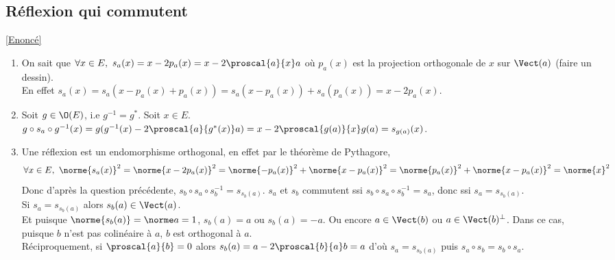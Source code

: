 \documentclass[8pt]{book}
\begin{document}
	\subsection{Réflexion qui commutent}
	\label{Réflexion qui commutent corrigé}
	\textcolor{blue}{\hyperref[Réflexion qui commutent]{[Enoncé]}}\\
	\begin{enumerate}[leftmargin=*]
		\item On sait que $\forall x\in E,\ s_a(x)=x-2p_a(x)=x-2\proscal{a}{x}a$ où $p_a(x)$ est la projection orthogonale de $x$ sur $\Vect(a)$ (faire un dessin).\\
		En effet $s_a(x)=s_a(x-p_a(x)+p_a(x))=s_a(x-p_a(x))+s_a(p_a(x))=x-2p_a(x)$.
		\item Soit $g\in \O(E)$, i.e $g^{-1}=g^*$. Soit $x\in E$.\\
		$g\circ s_a\circ g^{-1}(x)=g(g^{-1}(x)-2\proscal{a}{g^*(x)}a)=x-2\proscal{g(a)}{x}g(a)=s_{g(a)}(x)$.
		\item Une réflexion est un endomorphisme orthogonal, en effet par le théorème de Pythagore, $$\forall x\in E,\ \norme{s_a(x)}^2=\norme{x-2p_a(x)}^2=\norme{-p_a(x)}^2+\norme{x-p_a(x)}^2=\norme{p_a(x)}^2+\norme{x-p_a(x)}^2=\norme{x}^2$$
		Donc d'après la question précédente, $s_b\circ s_a\circ s_b^{-1}=s_{s_b(a)}$.
		$s_a$ et $s_b$ commutent ssi $s_b\circ s_a\circ s_b^{-1}=s_a$, donc ssi $s_a=s_{s_b(a)}$.\\
		Si $s_a=s_{s_b(a)}$ alors $s_b(a)\in\Vect(a)$.\\
		Et puisque $\norme{s_b(a)}=\norme a=1$, $s_b(a)=a$ ou $s_b(a)=-a$. Ou encore $a\in \Vect(b)$ ou $a\in \Vect(b)^\bot$. Dans ce cas, puisque $b$ n'est pas colinéaire à $a$, $b$ est orthogonal à $a$.\\
		Réciproquement, si $\proscal{a}{b}=0$ alors $s_b(a)=a-2\proscal{b}{a}b=a$ d'où $s_a=s_{s_b(a)}$ puis $s_a\circ s_b=s_b\circ s_a$.
	\end{enumerate}
	
\end{document}

